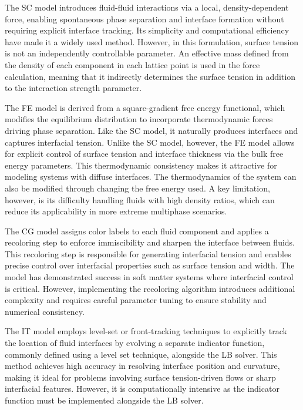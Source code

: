 The SC model introduces fluid-fluid interactions via a local, density-dependent force, enabling spontaneous phase separation and interface 
formation without requiring explicit interface tracking. 
\cite{shan_lattice_1993, shan_simulation_1994, shan_multicomponent_1995, jansen_bijels_2011,gunther_timescales_2014}
Its simplicity and computational efficiency have made it a widely used method. However,
in this formulation, surface tension is not an independently controllable parameter. An effective mass defined from the density of each component
in each lattice point is used in the force calculation, meaning that it indirectly determines the surface tension in addition to the interaction
strength parameter.

The FE model is derived from a square-gradient free energy functional, which modifies the equilibrium distribution to incorporate thermodynamic 
forces driving phase separation. \cite{swift_lattice_1996, kendon_inertial_2001, briant_lattice_2004} Like the SC model, it naturally produces interfaces and captures interfacial tension. Unlike the SC model, however, 
the FE model allows for explicit control of surface tension and interface thickness via the bulk free energy parameters. This thermodynamic 
consistency makes it attractive for modeling systems with diffuse interfaces. The thermodynamics of the system can also be modified through changing the free energy used.
\cite{swift_lattice_1996, briant_lattice_2004, kendon_inertial_2001}
A key limitation, however, is its difficulty handling fluids with high density ratios, which can reduce its applicability in more extreme multiphase scenarios.

The CG model assigns color labels to each fluid component and applies a recoloring step to enforce immiscibility and sharpen the interface 
between fluids. 
\cite{mora_optimal_2021, latva-kokko_static_2005, huang_study_2014, liu_multiphase_2016}
This recoloring step is responsible for generating interfacial tension and enables precise control over interfacial properties such 
as surface tension and width. The model has demonstrated success in soft matter systems where interfacial control is critical. However, implementing 
the recoloring algorithm introduces additional complexity and requires careful parameter tuning to ensure stability and numerical consistency. \cite{mora_optimal_2021}

The IT model employs level-set or front-tracking techniques to explicitly track the location of fluid interfaces by evolving a separate indicator 
function, commonly defined using a level set technique, alongside the LB solver. \cite{haghani_hassan_abadi_conservative_2018, liang_lattice_2023}
This method achieves high accuracy in resolving interface position and curvature, making it ideal for problems 
involving surface tension-driven flows or sharp interfacial features. However, it is computationally intensive as the indicator function must be implemented alongside
the LB solver. 

